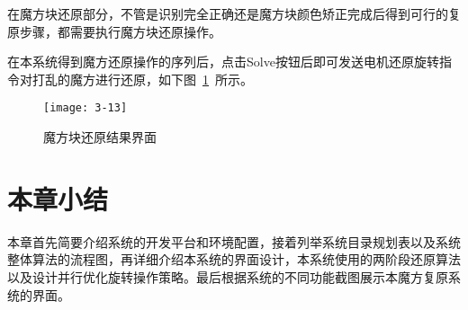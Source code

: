 在魔方块还原部分，不管是识别完全正确还是魔方块颜色矫正完成后得到可行的复原步骤，都需要执行魔方块还原操作。

在本系统得到魔方还原操作的序列后，点击Solve按钮后即可发送电机还原旋转指令对打乱的魔方进行还原，如下图~\ref{fig:3-13}~所示。

\begin{figure}[H]
	\centering
	\texttt{[image: 3-13]}
	\caption{魔方块还原结果界面}\label{fig:3-13}
\end{figure}

\section{本章小结}

本章首先简要介绍系统的开发平台和环境配置，接着列举系统目录规划表以及系统整体算法的流程图，再详细介绍本系统的界面设计，本系统使用的两阶段还原算法以及设计并行优化旋转操作策略。最后根据系统的不同功能截图展示本魔方复原系统的界面。